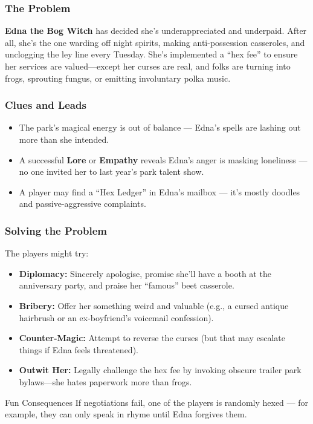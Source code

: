 \subsubsection{The Problem}
\textbf{Edna the Bog Witch} has decided she’s underappreciated and underpaid. After all, she’s the one warding off night spirits, making anti-possession casseroles, and unclogging the ley line every Tuesday. She’s implemented a “hex fee” to ensure her services are valued—except her curses are real, and folks are turning into frogs, sprouting fungus, or emitting involuntary polka music.

\subsubsection{Clues and Leads}
\begin{itemize}
    \item The park’s magical energy is out of balance — Edna’s spells are lashing out more than she intended.
    \item A successful \textbf{Lore} or \textbf{Empathy}  reveals Edna’s anger is masking loneliness — no one invited her to last year’s park talent show.
    \item A player may find a “Hex Ledger” in Edna’s mailbox — it's mostly doodles and passive-aggressive complaints.
\end{itemize}

\subsubsection{Solving the Problem}
The players might try:
\begin{itemize}
    \item \textbf{Diplomacy:} Sincerely apologise, promise she’ll have a booth at the anniversary party, and praise her “famous” beet casserole.
    \item \textbf{Bribery:} Offer her something weird and valuable (e.g., a cursed antique hairbrush or an ex-boyfriend's voicemail confession).
    \item \textbf{Counter-Magic:} Attempt to reverse the curses (but that may escalate things if Edna feels threatened).
    \item \textbf{Outwit Her:} Legally challenge the hex fee by invoking obscure trailer park bylaws—she hates paperwork more than frogs.
\end{itemize}

\begin{CommentBox}{Fun Consequences}
    If negotiations fail, one of the players is randomly hexed — for example, they can only speak in rhyme until Edna forgives them.
\end{CommentBox}



